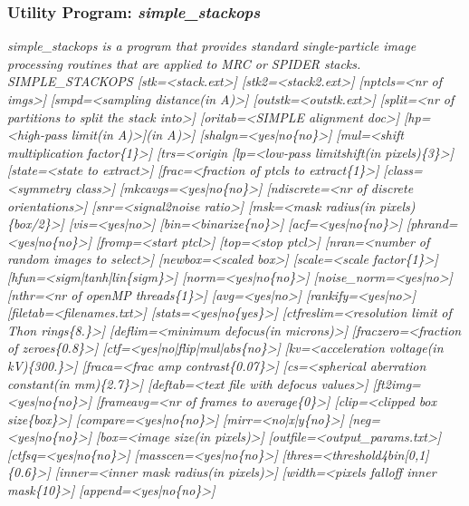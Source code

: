 \documentclass[review]{elsarticle}
\begin{document}
{{\subsubsection{Utility Program: {\it{simple\_stackops}}}
\label{stackops}
{\it{simple\_stackops} is a program that provides standard single-particle image processing routines that are applied to MRC or SPIDER stacks.}\\
{\it{SIMPLE\_STACKOPS [stk=<stack.ext>] [stk2=<stack2.ext>] [nptcls=<nr of imgs>]}}
{\it{[smpd=<sampling distance(in A)>] [outstk=<outstk.ext>] [split=<nr of partitions}}
{\it{to split the stack into>] [oritab=<SIMPLE alignment doc>] [hp=<high-pass}}
{\it{limit(in A)>](in A)>] [shalgn=<yes|no\{no\}>] [mul=<shift multiplication}}
{\it{factor\{1\}>] [trs=<origin [lp=<low-pass limitshift(in pixels)\{3\}>]}}
{\it{[state=<state to extract>] [frac=<fraction of ptcls to extract\{1\}>]}}
{\it{[class=<symmetry class>] [mkcavgs=<yes|no\{no\}>] [ndiscrete=<nr of discrete}}
{\it{orientations>] [snr=<signal2noise ratio>] [msk=<mask radius(in}}
{\it{pixels)\{box/2\}>] [vis=<yes|no>] [bin=<binarize\{no\}>] [acf=<yes|no\{no\}>]}}
{\it{[phrand=<yes|no\{no\}>] [fromp=<start ptcl>] [top=<stop ptcl>] [nran=<number of}}
{\it{random images to select>] [newbox=<scaled box>] [scale=<scale factor\{1\}>]}}
{\it{[hfun=<sigm|tanh|lin\{sigm\}>] [norm=<yes|no\{no\}>] [noise\_norm=<yes|no>]}}
{\it{[nthr=<nr of openMP threads\{1\}>] [avg=<yes|no>] [rankify=<yes|no>]}}
{\it{[filetab=<filenames.txt>] [stats=<yes|no\{yes\}>] [ctfreslim=<resolution limit}}
{\it{of Thon rings\{8.\}>] [deflim=<minimum defocus(in microns)>]}}
{\it{[fraczero=<fraction of zeroes\{0.8\}>] [ctf=<yes|no|flip|mul|abs\{no\}>]}}
{\it{[kv=<acceleration voltage(in kV)\{300.\}>] [fraca=<frac amp contrast\{0.07\}>]}}
{\it{[cs=<spherical aberration constant(in mm)\{2.7\}>] [deftab=<text file with}}
{\it{defocus values>] [ft2img=<yes|no\{no\}>] [frameavg=<nr of frames to}}
{\it{average\{0\}>] [clip=<clipped box size\{box\}>] [compare=<yes|no\{no\}>]}}
{\it{[mirr=<no|x|y\{no\}>] [neg=<yes|no\{no\}>] [box=<image size(in pixels)>]}}
{\it{[outfile=<output\_params.txt>] [ctfsq=<yes|no\{no\}>] [masscen=<yes|no\{no\}>]}}
{\it{[thres=<threshold4bin[0,1]\{0.6\}>] [inner=<inner mask radius(in pixels)>]}}
{\it{[width=<pixels falloff inner mask\{10\}>] [append=<yes|no\{no\}>]}}
\\\\
}}
\end{document}
